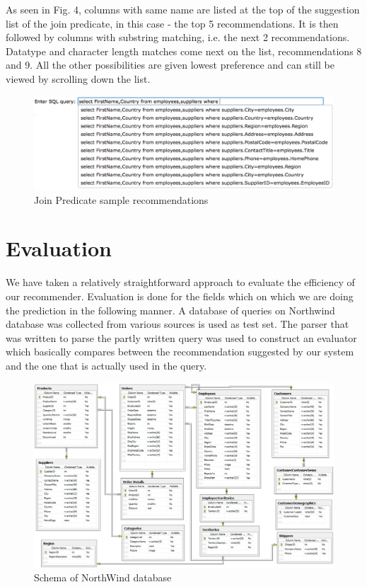 \documentclass{acm_proc_article-sp}
\begin{document}
As seen in Fig. 4, columns with same name are listed at the top of the suggestion list of the join predicate, in this case - the top 5 recommendations. It is then followed by columns with substring matching, i.e. the next 2 recommendations. Datatype and character length matches come next on the list, recommendations 8 and 9. All the other possibilities are given lowest preference and can still be viewed by scrolling down the list.

\begin{figure}
\centering
\includegraphics[width=170mm]{join_predicate.png}
\caption{Join Predicate sample recommendations}
\label{overflow}
\end{figure}

\section{Evaluation}
We have taken a relatively straightforward approach to evaluate the efficiency of our recommender. Evaluation is done for the fields which on which we are doing the prediction in the following manner. A database of queries on Northwind database was collected from various sources is used as test set. The parser that was written to parse the partly written query was used to construct an evaluator which basically compares between the recommendation suggested by our system and the one that is actually used in the query. 

\begin{figure}
\centering
\includegraphics[width=170mm]{Northwind_schema.png}
\caption{Schema of NorthWind database}
\label{overflow}
\end{figure}
\end{document}
